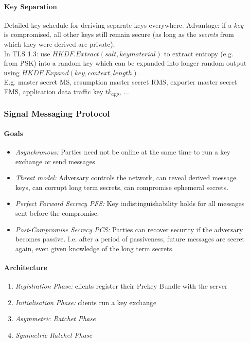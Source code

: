 \paragraph{Key Separation}
Detailed key schedule for deriving separate keys everywhere.
Advantage: if a \emph{key} is compromised, all other keys still remain secure
(as long as the \emph{secrets} from which they were derived are private).
\\
In TLS 1.3: use $HKDF.Extract(salt, keymaterial)$ to extract entropy (e.g. from PSK)
into a random key which can be expanded into longer random output using $HKDF.Expand(key, context, length)$.
\\
E.g. master secret MS, resumption master secret RMS, exporter master secret EMS,
application data traffic key $tk_{app}$, ...


\subsubsection{Signal Messaging Protocol}

\paragraph{Goals}
\begin{itemize}
\item \emph{Asynchronous:}
Parties need not be online at the same time to run a key exchange or send messages.
\item \emph{Threat model:}
Adversary controls the network, can reveal derived message keys, can corrupt long term secrets, can compromise ephemeral secrets.
\item \emph{Perfect Forward Secrecy PFS:}
Key indistinguishability holds for all messages sent before the compromise.
\item \emph{Post-Compromise Secrecy PCS:}
Parties can recover security if the adversary becomes passive.
I.e. after a period of passiveness, future messages are secret again, even given knowledge of the long term secrets.
\end{itemize}

\paragraph{Architecture}
\begin{enumerate}
\item \emph{Registration Phase:} clients register their Prekey Bundle with the server
\item \emph{Initialisation Phase:} clients run a key exchange
\item \emph{Asymmetric Ratchet Phase}
\item \emph{Symmetric Ratchet Phase}
\end{enumerate}

